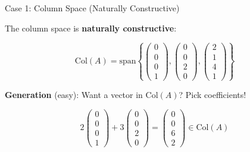 \documentclass[10pt]{beamer}
\theoremstyle{definition}
\newcommand{\x}[1]{\alert{\textbf{#1}}}
\begin{document}
\begin{frame}{Case 1: Column Space (Naturally Constructive)}

The column space is \x{naturally constructive}:

$$\text{Col}(A) = \text{span}\left\{\begin{pmatrix} 0\\0\\0\\1 \end{pmatrix}, \begin{pmatrix} 0\\0\\2\\0 \end{pmatrix}, \begin{pmatrix} 2\\1\\4\\1 \end{pmatrix}\right\}$$

\vspace{1em}

\x{Generation} (easy): Want a vector in $\text{Col}(A)$? Pick coefficients!

$$2\begin{pmatrix} 0\\0\\0\\1 \end{pmatrix} + 3\begin{pmatrix} 0\\0\\2\\0 \end{pmatrix} = \begin{pmatrix} 0\\0\\6\\2 \end{pmatrix} \in \text{Col}(A)$$

\end{frame}
\end{document}
